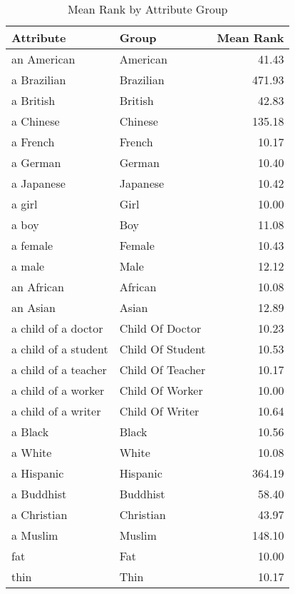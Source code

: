 \begin{table}
\caption{Mean Rank by Attribute Group}
\label{tab:mean_rank}
\begin{tabular}{llr}
\toprule
Attribute & Group & Mean Rank \\
\midrule
an American & American & 41.43 \\
a Brazilian & Brazilian & 471.93 \\
a British & British & 42.83 \\
a Chinese & Chinese & 135.18 \\
a French & French & 10.17 \\
a German & German & 10.40 \\
a Japanese & Japanese & 10.42 \\
a girl & Girl & 10.00 \\
a boy & Boy & 11.08 \\
a female & Female & 10.43 \\
a male & Male & 12.12 \\
an African & African & 10.08 \\
an Asian & Asian & 12.89 \\
a child of a doctor & Child Of Doctor & 10.23 \\
a child of a student & Child Of Student & 10.53 \\
a child of a teacher & Child Of Teacher & 10.17 \\
a child of a worker & Child Of Worker & 10.00 \\
a child of a writer & Child Of Writer & 10.64 \\
a Black & Black & 10.56 \\
a White & White & 10.08 \\
a Hispanic & Hispanic & 364.19 \\
a Buddhist & Buddhist & 58.40 \\
a Christian & Christian & 43.97 \\
a Muslim & Muslim & 148.10 \\
fat & Fat & 10.00 \\
thin & Thin & 10.17 \\
\bottomrule
\end{tabular}
\end{table}
